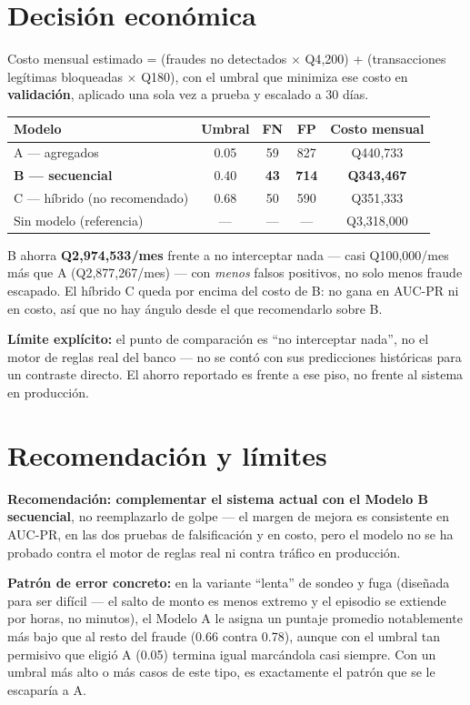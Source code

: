 \documentclass[10.5pt]{article}
\begin{document}
\section{Decisión económica}

Costo mensual estimado = (fraudes no detectados $\times$ Q4{,}200) + (transacciones legítimas
bloqueadas $\times$ Q180), con el umbral que minimiza ese costo en \textbf{validación}, aplicado una
sola vez a prueba y escalado a 30 días.

\begin{center}
\begin{tabular}{lcccc}
\toprule
Modelo & Umbral & FN & FP & Costo mensual \\
\midrule
A — agregados & 0.05 & 59 & 827 & Q440{,}733 \\
\textbf{B — secuencial} & 0.40 & \textbf{43} & \textbf{714} & \textbf{Q343{,}467} \\
C — híbrido (no recomendado) & 0.68 & 50 & 590 & Q351{,}333 \\
\midrule
Sin modelo (referencia) & — & — & — & Q3{,}318{,}000 \\
\bottomrule
\end{tabular}
\end{center}

B ahorra \textbf{Q2{,}974{,}533/mes} frente a no interceptar nada — casi Q100{,}000/mes más que A
(Q2{,}877{,}267/mes) — con \emph{menos} falsos positivos, no solo menos fraude escapado. El híbrido C
queda por encima del costo de B: no gana en AUC-PR ni en costo, así que no hay ángulo desde el que
recomendarlo sobre B.

\textbf{Límite explícito:} el punto de comparación es ``no interceptar nada'', no el motor de reglas
real del banco — no se contó con sus predicciones históricas para un contraste directo. El ahorro
reportado es frente a ese piso, no frente al sistema en producción.

\section{Recomendación y límites}

\textbf{Recomendación: complementar el sistema actual con el Modelo B secuencial}, no reemplazarlo
de golpe — el margen de mejora es consistente en AUC-PR, en las dos pruebas de falsificación y en
costo, pero el modelo no se ha probado contra el motor de reglas real ni contra tráfico en producción.

\textbf{Patrón de error concreto:} en la variante ``lenta'' de sondeo y fuga (diseñada para ser
difícil — el salto de monto es menos extremo y el episodio se extiende por horas, no minutos), el
Modelo A le asigna un puntaje promedio notablemente más bajo que al resto del fraude (0.66 contra
0.78), aunque con el umbral tan permisivo que eligió A (0.05) termina igual marcándola casi siempre.
Con un umbral más alto o más casos de este tipo, es exactamente el patrón que se le escaparía a A.
\end{document}
